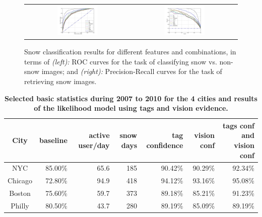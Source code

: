 \begin{figure}[th!]
\begin{center}
\vspace{-16pt}
\begin{tabular}{cc}
 \includegraphics[width=0.4\textwidth]{figure/ROC-CNN-curves.jpg} &
\includegraphics[width=0.4\textwidth]{figure/PR-CNN-curves.jpg} \\
\end{tabular}
\end{center}
\vspace{-8pt}
\caption{
Snow classification results for different features and combinations, in terms of {\textit{(left):}} ROC curves for the task of classifying snow vs. non-snow images; and 
{\textit{(right):}} Precision-Recall curves for the task of retrieving snow images.
}
\label{fig:PR_ROC_snow}
\end{figure}


\begin{table}\centering
\caption {\textbf{Selected basic statistics during 2007 to 2010 for the 4 cities and results of the likelihood model using tags and vision evidence.}}
\label{tab:city_conf_tag_vision} 
\begin{tabular}{@{}crrrrrr@{}}\toprule
City &  baseline & active user/day  & snow days &  tag confidence &  vision conf & tags conf and vision conf \\\midrule
{NYC} & 85.00\% & 65.6 & 185 &90.42\%&90.29\% &92.34\%\\
{Chicago} &72.80\% & 94.9 & 418 &94.12\% &93.16\% &95.08\%  \\
{Boston} & 75.60\%& 59.7 & 373 &89.18\%&85.21\% & 91.23\% \\
{Philly} & 80.50\% & 43.7 & 280 & 89.19\% &85.09\% & 89.19\%  \\
\bottomrule
\end{tabular}
\vspace{-12pt}
\end{table}

